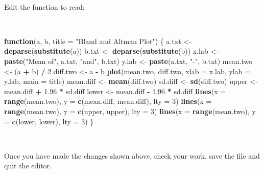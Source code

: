\documentclass[12pt,a4paper]{book}
\newenvironment{Shaded}{\begin{snugshade}}{\end{snugshade}}
\newcommand{\ControlFlowTok}[1]{\textcolor[rgb]{0.13,0.29,0.53}{\textbf{#1}}}
\newcommand{\DataTypeTok}[1]{\textcolor[rgb]{0.13,0.29,0.53}{#1}}
\newcommand{\DecValTok}[1]{\textcolor[rgb]{0.00,0.00,0.81}{#1}}
\newcommand{\FloatTok}[1]{\textcolor[rgb]{0.00,0.00,0.81}{#1}}
\newcommand{\KeywordTok}[1]{\textcolor[rgb]{0.13,0.29,0.53}{\textbf{#1}}}
\newcommand{\NormalTok}[1]{#1}
\newcommand{\OperatorTok}[1]{\textcolor[rgb]{0.81,0.36,0.00}{\textbf{#1}}}
\newcommand{\StringTok}[1]{\textcolor[rgb]{0.31,0.60,0.02}{#1}}
\theoremstyle{definition}
\theoremstyle{definition}
\theoremstyle{definition}
\theoremstyle{remark}
\begin{document}
~

Edit the function to read:

~

\begin{Shaded}
\begin{Highlighting}[]
\ControlFlowTok{function}\NormalTok{(a, b, }\DataTypeTok{title =} \StringTok{"Bland and Altman Plot"}\NormalTok{) \{}
\NormalTok{  a.txt <-}\StringTok{ }\KeywordTok{deparse}\NormalTok{(}\KeywordTok{substitute}\NormalTok{(a))}
\NormalTok{  b.txt <-}\StringTok{ }\KeywordTok{deparse}\NormalTok{(}\KeywordTok{substitute}\NormalTok{(b))}
\NormalTok{  x.lab <-}\StringTok{ }\KeywordTok{paste}\NormalTok{(}\StringTok{"Mean of"}\NormalTok{, a.txt, }\StringTok{"and"}\NormalTok{, b.txt)}
\NormalTok{  y.lab <-}\StringTok{ }\KeywordTok{paste}\NormalTok{(a.txt, }\StringTok{"-"}\NormalTok{, b.txt)}
\NormalTok{  mean.two <-}\StringTok{ }\NormalTok{(a }\OperatorTok{+}\StringTok{ }\NormalTok{b) }\OperatorTok{/}\StringTok{ }\DecValTok{2}
\NormalTok{  diff.two <-}\StringTok{ }\NormalTok{a }\OperatorTok{-}\StringTok{ }\NormalTok{b}
  \KeywordTok{plot}\NormalTok{(mean.two, diff.two, }\DataTypeTok{xlab =}\NormalTok{ x.lab, }\DataTypeTok{ylab =}\NormalTok{ y.lab, }\DataTypeTok{main =}\NormalTok{ title) }
\NormalTok{  mean.diff <-}\StringTok{ }\KeywordTok{mean}\NormalTok{(diff.two)}
\NormalTok{  sd.diff <-}\StringTok{ }\KeywordTok{sd}\NormalTok{(diff.two)}
\NormalTok{  upper <-}\StringTok{ }\NormalTok{mean.diff }\OperatorTok{+}\StringTok{ }\FloatTok{1.96} \OperatorTok{*}\StringTok{ }\NormalTok{sd.diff}
\NormalTok{  lower <-}\StringTok{ }\NormalTok{mean.diff }\OperatorTok{-}\StringTok{ }\FloatTok{1.96} \OperatorTok{*}\StringTok{ }\NormalTok{sd.diff}
  \KeywordTok{lines}\NormalTok{(}\DataTypeTok{x =} \KeywordTok{range}\NormalTok{(mean.two), }\DataTypeTok{y =} \KeywordTok{c}\NormalTok{(mean.diff, mean.diff), }\DataTypeTok{lty =} \DecValTok{3}\NormalTok{) }
  \KeywordTok{lines}\NormalTok{(}\DataTypeTok{x =} \KeywordTok{range}\NormalTok{(mean.two), }\DataTypeTok{y =} \KeywordTok{c}\NormalTok{(upper, upper), }\DataTypeTok{lty =} \DecValTok{3}\NormalTok{)}
  \KeywordTok{lines}\NormalTok{(}\DataTypeTok{x =} \KeywordTok{range}\NormalTok{(mean.two), }\DataTypeTok{y =} \KeywordTok{c}\NormalTok{(lower, lower), }\DataTypeTok{lty =} \DecValTok{3}\NormalTok{)}
\NormalTok{\}}
\end{Highlighting}
\end{Shaded}

~

Once you have made the changes shown above, check your work, save the
file and quit the editor.
\end{document}
